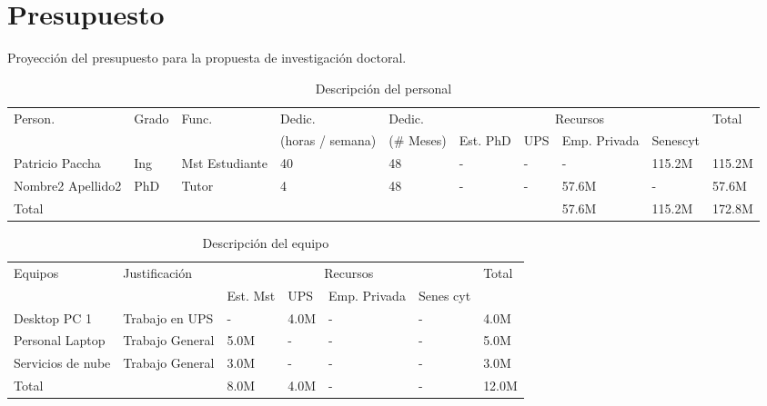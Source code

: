 \documentclass[12pt,a4paper]{article}
\begin{document}
\section{Presupuesto}
Proyección del presupuesto para la propuesta de investigación doctoral.
\begin{table}[ht!]
\caption{Descripción del personal}
\begin{tabular}{|p{1.1cm}|p{1.1cm}|p{1.1cm}|p{1.1cm}|p{1.3cm}|p{1.1cm}|p{1.1cm}|p{1.1cm}|p{1.1cm}|p{1.1cm}|} \hline
Person. & Grado & Func. & Dedic.  & Dedic.  & \multicolumn{4}{|c|}{Recursos} & Total \\ \cline{6-9}
  &   &   & (horas / semana)  &  (\# Meses) & Est. PhD  & UPS & Emp. Privada & Senescyt &  \\ \hline \hline
  Patricio Paccha  & Ing  & Mst Estudiante  & 40 & 48 & - & - & - & 115.2M & 115.2M \\ \hline
  Nombre2 Apellido2  & PhD  & Tutor & 4 & 48 & - & - & 57.6M & - & 57.6M \\ \hline
Total &    &   &   &   &   &   & 57.6M &  115.2M & 172.8M \\ \hline
\end{tabular}
\end{table}

\begin{table}[ht!]
\caption{Descripción del equipo}
\begin{tabular}{|p{3.4cm}|p{3.4cm}|p{1.1cm}|p{1.1cm}|p{1.1cm}|p{1.1cm}|p{1.1cm}|} \hline
Equipos & Justificación & \multicolumn{4}{|c|}{Recursos} & Total \\ \cline{3-6}
 &   & Est. Mst & UPS & Emp. Privada & Senes cyt &  \\ \hline \hline
Desktop PC 1      & Trabajo en UPS  & -    & 4.0M & - & - & 4.0M \\ \hline
Personal Laptop   & Trabajo General & 5.0M & -    & - & - & 5.0M \\ \hline
Servicios de nube & Trabajo General & 3.0M & -    & - & - & 3.0M \\ \hline
Total           &                 & 8.0M & 4.0M & - & - & 12.0M \\ \hline
\end{tabular}
\end{table}
\end{document}
